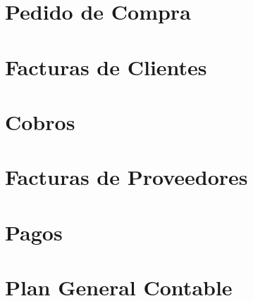 \documentclass[letterpaper,10pt,spanish]{sphinxmanual}
\begin{document}
\section{Pedido de Compra}
\label{\detokenize{funcional/compras/pedido-de-compra:pedido-de-compra}}\label{\detokenize{funcional/compras/pedido-de-compra:id1}}\label{\detokenize{funcional/compras/pedido-de-compra::doc}}


\section{Facturas de Clientes}
\label{\detokenize{funcional/facturacion/facturas-de-clientes:facturas-de-clientes}}\label{\detokenize{funcional/facturacion/facturas-de-clientes:id1}}\label{\detokenize{funcional/facturacion/facturas-de-clientes::doc}}

\section{Cobros}
\label{\detokenize{funcional/facturacion/cobros:cobros}}\label{\detokenize{funcional/facturacion/cobros:id1}}\label{\detokenize{funcional/facturacion/cobros::doc}}

\section{Facturas de Proveedores}
\label{\detokenize{funcional/facturacion/facturas-de-proveedores:facturas-de-proveedores}}\label{\detokenize{funcional/facturacion/facturas-de-proveedores:id1}}\label{\detokenize{funcional/facturacion/facturas-de-proveedores::doc}}

\section{Pagos}
\label{\detokenize{funcional/facturacion/pagos:pagos}}\label{\detokenize{funcional/facturacion/pagos:id1}}\label{\detokenize{funcional/facturacion/pagos::doc}}


\section{Plan General Contable}
\label{\detokenize{funcional/contabilidad/plan-general-contable:plan-general-contable}}\label{\detokenize{funcional/contabilidad/plan-general-contable:id1}}\label{\detokenize{funcional/contabilidad/plan-general-contable::doc}}
\end{document}
